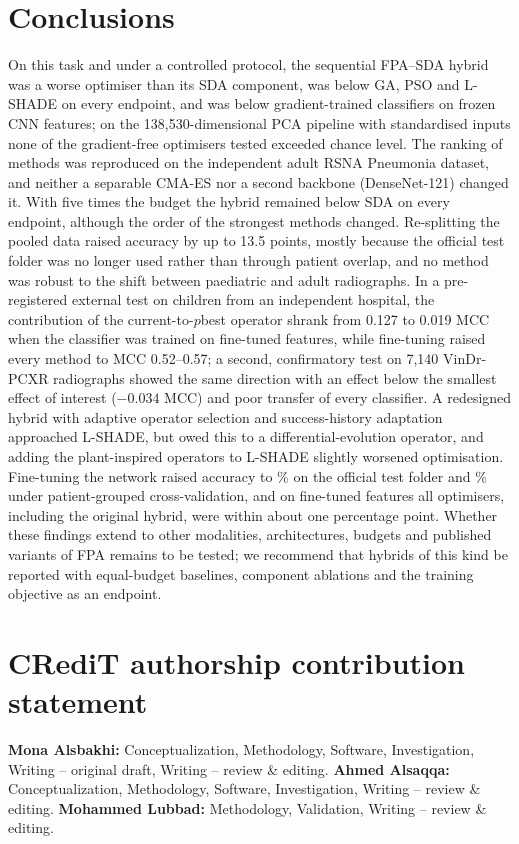 \documentclass[preprint,12pt]{elsarticle}
\begin{document}
\section{Conclusions}\label{sec:conclusion}
On this task and under a controlled protocol, the sequential FPA--SDA hybrid was a worse optimiser than its SDA component, was below GA, PSO and L-SHADE on every endpoint, and was below gradient-trained classifiers on frozen CNN features; on the 138,530-dimensional PCA pipeline with standardised inputs none of the gradient-free optimisers tested exceeded chance level. The ranking of methods was reproduced on the independent adult RSNA Pneumonia dataset, and neither a separable CMA-ES nor a second backbone (DenseNet-121) changed it. With five times the budget the hybrid remained below SDA on every endpoint, although the order of the strongest methods changed. Re-splitting the pooled data raised accuracy by up to 13.5 points, mostly because the official test folder was no longer used rather than through patient overlap, and no method was robust to the shift between paediatric and adult radiographs. In a pre-registered external test on children from an independent hospital, the contribution of the current-to-$p$best operator shrank from 0.127 to 0.019 MCC when the classifier was trained on fine-tuned features, while fine-tuning raised every method to MCC 0.52--0.57; a second, confirmatory test on 7,140 VinDr-PCXR radiographs showed the same direction with an effect below the smallest effect of interest ($-0.034$ MCC) and poor transfer of every classifier. A redesigned hybrid with adaptive operator selection and success-history adaptation approached L-SHADE, but owed this to a differential-evolution operator, and adding the plant-inspired operators to L-SHADE slightly worsened optimisation. Fine-tuning the network raised accuracy to \FTOffAcc\% on the official test folder and \FTCvAcc\% under patient-grouped cross-validation, and on fine-tuned features all optimisers, including the original hybrid, were within about one percentage point. Whether these findings extend to other modalities, architectures, budgets and published variants of FPA remains to be tested; we recommend that hybrids of this kind be reported with equal-budget baselines, component ablations and the training objective as an endpoint.

\section*{CRediT authorship contribution statement}
\textbf{Mona Alsbakhi:} Conceptualization, Methodology, Software, Investigation, Writing -- original draft, Writing -- review \& editing. \textbf{Ahmed Alsaqqa:} Conceptualization, Methodology, Software, Investigation, Writing -- review \& editing. \textbf{Mohammed Lubbad:} Methodology, Validation, Writing -- review \& editing.
\end{document}
